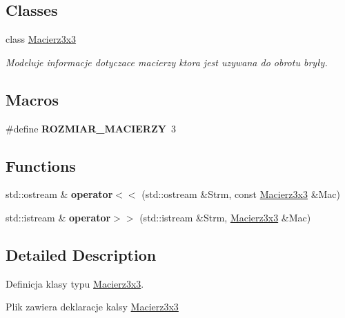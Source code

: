 \subsection*{Classes}
\begin{DoxyCompactItemize}
\item 
class \hyperlink{class_macierz3x3}{Macierz3x3}
\begin{DoxyCompactList}\small\item\em Modeluje informacje dotyczace macierzy ktora jest uzywana do obrotu bryły. \end{DoxyCompactList}\end{DoxyCompactItemize}
\subsection*{Macros}
\begin{DoxyCompactItemize}
\item 
\hypertarget{_macierz3x3_8hh_a9d01784f7ff1b3fd53cb75db78488adc}{\#define {\bfseries R\+O\+Z\+M\+I\+A\+R\+\_\+\+M\+A\+C\+I\+E\+R\+Z\+Y}~3}\label{_macierz3x3_8hh_a9d01784f7ff1b3fd53cb75db78488adc}

\end{DoxyCompactItemize}
\subsection*{Functions}
\begin{DoxyCompactItemize}
\item 
\hypertarget{_macierz3x3_8hh_a7d624426c40b579f848005cc55b24ea6}{std\+::ostream \& {\bfseries operator$<$$<$} (std\+::ostream \&Strm, const \hyperlink{class_macierz3x3}{Macierz3x3} \&Mac)}\label{_macierz3x3_8hh_a7d624426c40b579f848005cc55b24ea6}

\item 
\hypertarget{_macierz3x3_8hh_a7ad250d858c386e1ddc4ce17e3b885b5}{std\+::istream \& {\bfseries operator$>$$>$} (std\+::istream \&Strm, \hyperlink{class_macierz3x3}{Macierz3x3} \&Mac)}\label{_macierz3x3_8hh_a7ad250d858c386e1ddc4ce17e3b885b5}

\end{DoxyCompactItemize}


\subsection{Detailed Description}
Definicja klasy typu \hyperlink{class_macierz3x3}{Macierz3x3}. 

Plik zawiera deklaracje kalsy \hyperlink{class_macierz3x3}{Macierz3x3} 